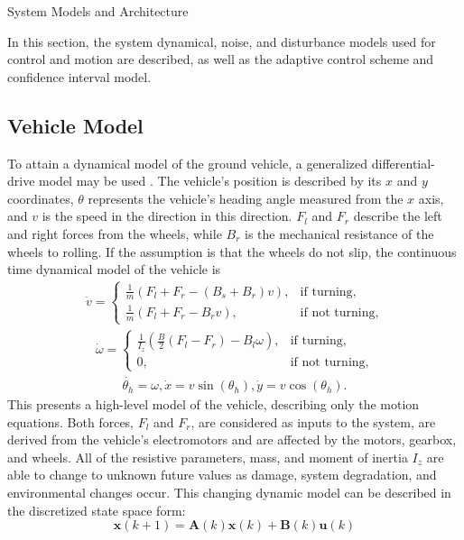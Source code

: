 \begin{section}{System Models and Architecture}
	
\label{sec:modeling}
In this section, the system dynamical, noise, and disturbance models used for control and motion are described, as well as the adaptive control scheme and confidence interval model.


\subsection{Vehicle Model}
To attain a dynamical model of the ground vehicle, a generalized differential-drive model may be used \cite{nutaro2011building}. The vehicle's position is described by its $x$ and $y$ coordinates, $\theta$ represents the vehicle's heading angle measured from the $x$ axis, and $v$ is the speed in the direction in this direction. $F_l$ and $F_r$ describe the left and right forces from the wheels, while $B_r$ is the mechanical resistance of the wheels to rolling. If the assumption is that the wheels do not slip, the continuous time dynamical model of the vehicle is
    \begin{align}
        \dot{v}=\begin{cases}
            \frac{1}{m}(F_l+F_r-(B_s+B_r)v), & \text{if turning},\\
            \frac{1}{m}(F_l+F_r-B_rv), & \text{if not turning},
        \end{cases}
    \end{align}
    \begin{align}
        \dot{\omega}=\begin{cases}
            \frac{1}{I_z}(\frac{B}{2}(F_l-F_r)-B_l\omega), &\text{if turning},\\
            0, & \text{if not turning},
        \end{cases}
	\end{align}
	\begin{align}
        \dot{\theta_h}=\omega, \dot{x}=v\sin(\theta_h), \dot{y}=v\cos(\theta_h).
	\end{align}
This presents a high-level model of the vehicle, describing only the motion equations. Both forces, $F_l$ and $F_r$, are considered as inputs to the system, are derived from the vehicle's electromotors and are affected by the motors, gearbox, and wheels. All of the resistive parameters, mass, and moment of inertia $I_z$ are able to change to unknown future values as damage, system degradation, and environmental changes occur. This changing dynamic model can be described in the discretized state space form:
    \begin{equation}
	\bm{x}(k+1) = \bm{A}(k)\bm{x}(k) + \bm{B}(k)\bm{u}(k)
	\end{equation}

\end{section}
